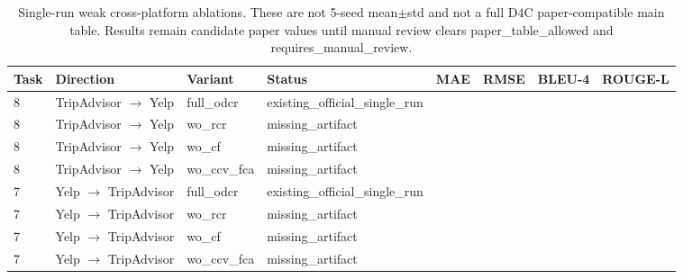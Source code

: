 \begin{table}[t]
\centering
\caption{Single-run weak cross-platform ablations. These are not 5-seed mean\(\pm\)std and not a full D4C paper-compatible main table. Results remain candidate paper values until manual review clears paper\_table\_allowed and requires\_manual\_review.}
\label{tab:weak-cross-platform-ablation}
\begin{tabular}{llllcccc}
\toprule
Task & Direction & Variant & Status & MAE & RMSE & BLEU-4 & ROUGE-L \\
\midrule
8 & TripAdvisor $\rightarrow$ Yelp & full\_odcr & existing\_official\_single\_run &  &  &  &  \\
8 & TripAdvisor $\rightarrow$ Yelp & wo\_rcr & missing\_artifact &  &  &  &  \\
8 & TripAdvisor $\rightarrow$ Yelp & wo\_cf & missing\_artifact &  &  &  &  \\
8 & TripAdvisor $\rightarrow$ Yelp & wo\_ccv\_fca & missing\_artifact &  &  &  &  \\
7 & Yelp $\rightarrow$ TripAdvisor & full\_odcr & existing\_official\_single\_run &  &  &  &  \\
7 & Yelp $\rightarrow$ TripAdvisor & wo\_rcr & missing\_artifact &  &  &  &  \\
7 & Yelp $\rightarrow$ TripAdvisor & wo\_cf & missing\_artifact &  &  &  &  \\
7 & Yelp $\rightarrow$ TripAdvisor & wo\_ccv\_fca & missing\_artifact &  &  &  &  \\
\bottomrule
\end{tabular}
\end{table}
